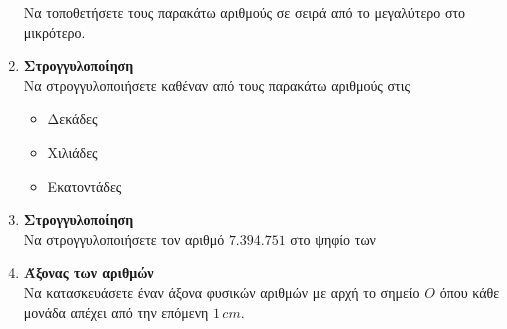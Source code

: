 \documentclass[twoside,nofonts,internet]{askhseis}
\begin{document}
\begin{enumerate}[itemsep=5mm]
Να τοποθετήσετε τους παρακάτω αριθμούς σε σειρά από το μεγαλύτερο στο μικρότερο.
\item \textbf{Στρογγυλοποίηση}\\
Να στρογγυλοποιήσετε καθέναν από τους παρακάτω αριθμούς στις
\begin{multicols}{3}
\begin{itemize}[leftmargin=2mm]
\item Δεκάδες
\item Χιλιάδες
\item Εκατοντάδες
\end{itemize}
\end{multicols}
\begin{multicols}{2}
\end{multicols}
\item \textbf{Στρογγυλοποίηση}\\
Να στρογγυλοποιήσετε τον αριθμό $ 7.394.751 $ στο ψηφίο των
\begin{multicols}{2}
\end{multicols}
\item \textbf{Άξονας των αριθμών}\\
Να κατασκευάσετε έναν άξονα φυσικών αριθμών με αρχή το σημείο $ O $ όπου κάθε μονάδα απέχει από την επόμενη $ 1\,cm $.
\begin{center}
\end{center}
\end{enumerate}
\end{document}
